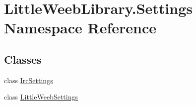 \hypertarget{namespace_little_weeb_library_1_1_settings}{}\section{Little\+Weeb\+Library.\+Settings Namespace Reference}
\label{namespace_little_weeb_library_1_1_settings}
\subsection*{Classes}
\begin{DoxyCompactItemize}
\item 
class \mbox{\hyperlink{class_little_weeb_library_1_1_settings_1_1_irc_settings}{Irc\+Settings}}
\item 
class \mbox{\hyperlink{class_little_weeb_library_1_1_settings_1_1_little_weeb_settings}{Little\+Weeb\+Settings}}
\end{DoxyCompactItemize}

